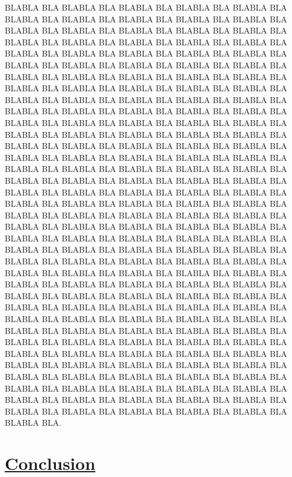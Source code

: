 \documentclass[a4paper, 12pt]{article}
\begin{document}
\begin{doublespace}
BLABLA BLA BLABLA BLA BLABLA BLA BLABLA BLA BLABLA BLA BLABLA BLA BLABLA BLA BLABLA BLA BLABLA BLA BLABLA BLA BLABLA BLA BLABLA BLA BLABLA BLA BLABLA BLA BLABLA BLA BLABLA BLA BLABLA BLA BLABLA BLA BLABLA BLA BLABLA BLA BLABLA BLA BLABLA BLA BLABLA BLA BLABLA BLA BLABLA BLA BLABLA BLA BLABLA BLA BLABLA BLA BLABLA BLA BLABLA BLA BLABLA BLA BLABLA BLA BLABLA BLA BLABLA BLA BLABLA BLA BLABLA BLA BLABLA BLA BLABLA BLA BLABLA BLA BLABLA BLA BLABLA BLA BLABLA BLA BLABLA BLA BLABLA BLA BLABLA BLA BLABLA BLA BLABLA BLA BLABLA BLA BLABLA BLA BLABLA BLA BLABLA BLA BLABLA BLA BLABLA BLA BLABLA BLA BLABLA BLA BLABLA BLA BLABLA BLA BLABLA BLA BLABLA BLA BLABLA BLA BLABLA BLA BLABLA BLA BLABLA BLA BLABLA BLA BLABLA BLA BLABLA BLA BLABLA BLA BLABLA BLA BLABLA BLA BLABLA BLA BLABLA BLA BLABLA BLA BLABLA BLA BLABLA BLA BLABLA BLA BLABLA BLA BLABLA BLA BLABLA BLA BLABLA BLA BLABLA BLA BLABLA BLA BLABLA BLA BLABLA BLA BLABLA BLA BLABLA BLA BLABLA BLA BLABLA BLA BLABLA BLA BLABLA BLA BLABLA BLA BLABLA BLA BLABLA BLA BLABLA BLA BLABLA BLA BLABLA BLA BLABLA BLA BLABLA BLA BLABLA BLA BLABLA BLA BLABLA BLA BLABLA BLA BLABLA BLA BLABLA BLA BLABLA BLA BLABLA BLA BLABLA BLA BLABLA BLA BLABLA BLA BLABLA BLA BLABLA BLA BLABLA BLA BLABLA BLA BLABLA BLA BLABLA BLA BLABLA BLA BLABLA BLA BLABLA BLA BLABLA BLA BLABLA BLA BLABLA BLA BLABLA BLA BLABLA BLA BLABLA BLA BLABLA BLA BLABLA BLA BLABLA BLA BLABLA BLA BLABLA BLA BLABLA BLA BLABLA BLA BLABLA BLA BLABLA BLA BLABLA BLA BLABLA BLA BLABLA BLA BLABLA BLA BLABLA BLA BLABLA BLA BLABLA BLA BLABLA BLA BLABLA BLA BLABLA BLA BLABLA BLA BLABLA BLA BLABLA BLA BLABLA BLA BLABLA BLA BLABLA BLA BLABLA BLA BLABLA BLA BLABLA BLA BLABLA BLA BLABLA BLA BLABLA BLA BLABLA BLA BLABLA BLA BLABLA BLA BLABLA BLA BLABLA BLA BLABLA BLA BLABLA BLA BLABLA BLA BLABLA BLA BLABLA BLA BLABLA BLA BLABLA BLA BLABLA BLA BLABLA BLA BLABLA BLA BLABLA BLA BLABLA BLA BLABLA BLA BLABLA BLA BLABLA BLA BLABLA BLA BLABLA BLA BLABLA BLA BLABLA BLA BLABLA BLA BLABLA BLA BLABLA BLA.
\end{doublespace}

\newpage \section*{\underline{Conclusion}}  
\end{document}
